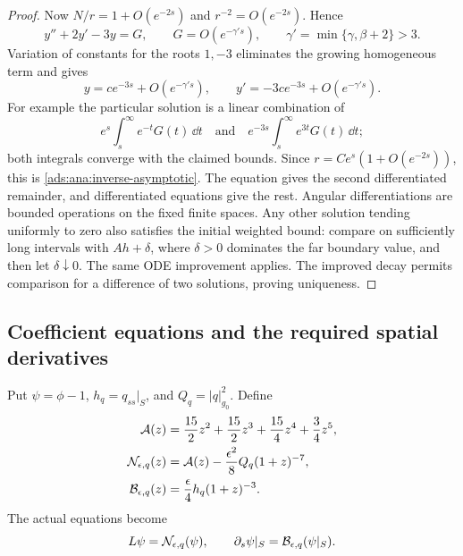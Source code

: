 \begin{proof}
Now $N/r=1+O(e^{-2s})$ and $r^{-2}=O(e^{-2s})$.  Hence
\[
  y''+2y'-3y=G,\qquad
  G=O(e^{-\gamma' s}),\qquad
  \gamma'=\min\{\gamma,\beta+2\}>3.
\]
Variation of constants for the roots $1,-3$ eliminates the growing
homogeneous term and gives
\[
 y=c e^{-3s}+O(e^{-\gamma' s}),\qquad
 y'=-3c e^{-3s}+O(e^{-\gamma' s}).
\]
For example the particular solution is a linear combination of
\[
 e^s\int_s^\infty e^{-t}G(t)\,\dd t
 \quad\text{and}\quad
 e^{-3s}\int_s^\infty e^{3t}G(t)\,\dd t;
\]
both integrals converge
with the claimed bounds.  Since
$r=C e^s(1+O(e^{-2s}))$, this is
\eqref{ads:ana:inverse-asymptotic}.  The equation gives the second
differentiated remainder, and differentiated equations give the rest.
Angular differentiations are bounded operations on the fixed finite
spaces.  Any other solution tending uniformly to zero also satisfies
the initial weighted bound: compare on sufficiently long intervals
with $Ah+\delta$, where $\delta>0$ dominates the far boundary value,
and then let $\delta\downarrow0$.  The same ODE improvement applies.
The improved decay permits comparison for a difference of two
solutions, proving uniqueness.
\end{proof}

\subsection{Coefficient equations and the required spatial derivatives}

Put $\psi=\phi-1$, $h_q=q_{ss}|_S$, and $Q_q=|q|_{g_0}^2$.  Define
\begin{align}
 \mathcal A(z)&=\frac{15}{2}z^2+\frac{15}{2}z^3
                    +\frac{15}{4}z^4+\frac34z^5,\notag\\
 \mathcal N_{\epsilon,q}(z)&=\mathcal A(z)
                    -\frac{\epsilon^2}{8}Q_q(1+z)^{-7},\notag\\
 \mathcal B_{\epsilon,q}(z)&=\frac{\epsilon}{4}h_q(1+z)^{-3}.
 \label{ads:ana:nonlinearities}
\end{align}
The actual equations become
\begin{equation}
 L\psi=\mathcal N_{\epsilon,q}(\psi),\qquad
 \partial_s\psi|_S=\mathcal B_{\epsilon,q}(\psi|_S).
 \label{ads:ana:actual-equations}
\end{equation}

